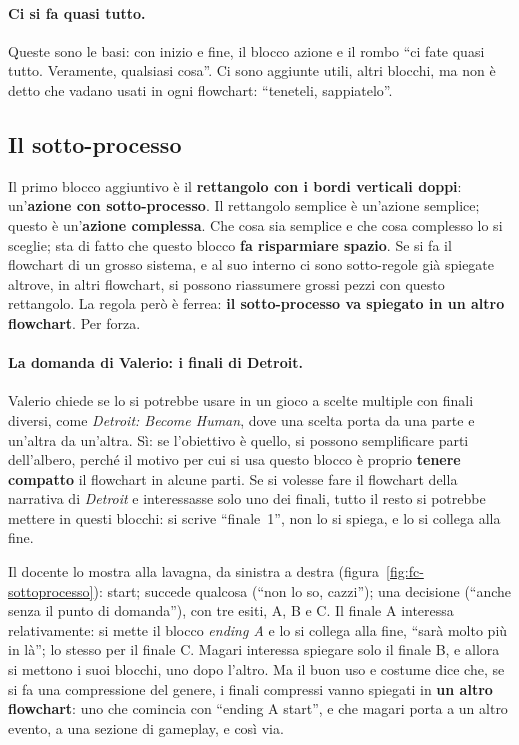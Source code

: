 \paragraph{Ci si fa quasi tutto.} Queste sono le basi: con inizio e fine, il
blocco azione e il rombo ``ci fate quasi tutto. Veramente, qualsiasi cosa''.
Ci sono aggiunte utili, altri blocchi, ma non è detto che vadano usati in ogni
flowchart: ``teneteli, sappiatelo''.

\subsection{Il sotto-processo}

Il primo blocco aggiuntivo è il \textbf{rettangolo con i bordi verticali
doppi}: un'\textbf{azione con sotto-processo}. Il rettangolo semplice è
un'azione semplice; questo è un'\textbf{azione complessa}. Che cosa sia
semplice e che cosa complesso lo si sceglie; sta di fatto che questo blocco
\textbf{fa risparmiare spazio}. Se si fa il flowchart di un grosso sistema, e
al suo interno ci sono sotto-regole già spiegate altrove, in altri
flowchart, si possono riassumere grossi pezzi con questo rettangolo. La
regola però è ferrea: \textbf{il sotto-processo va spiegato in un altro
flowchart}. Per forza.

\paragraph{La domanda di Valerio: i finali di Detroit.} Valerio chiede se lo si
potrebbe usare in un gioco a scelte multiple con finali diversi, come
\emph{Detroit: Become Human}, dove una scelta porta da una parte e un'altra da
un'altra. Sì: se l'obiettivo è quello, si possono semplificare parti
dell'albero, perché il motivo per cui si usa questo blocco è proprio
\textbf{tenere compatto} il flowchart in alcune parti. Se si volesse fare il
flowchart della narrativa di \emph{Detroit} e interessasse solo uno dei
finali, tutto il resto si potrebbe mettere in questi blocchi: si scrive
``finale~1'', non lo si spiega, e lo si collega alla fine.

Il docente lo mostra alla lavagna, da sinistra a destra
(figura~\ref{fig:fc-sottoprocesso}): start; succede qualcosa (``non lo so,
cazzi''); una decisione (``anche senza il punto di domanda''), con tre esiti,
A, B e C. Il finale A interessa relativamente: si mette il blocco
\emph{ending A} e lo si collega alla fine, ``sarà molto più in là''; lo
stesso per il finale C. Magari interessa spiegare solo il finale B, e allora
si mettono i suoi blocchi, uno dopo l'altro. Ma il buon uso e costume dice
che, se si fa una compressione del genere, i finali compressi vanno spiegati
in \textbf{un altro flowchart}: uno che comincia con ``ending A start'', e
che magari porta a un altro evento, a una sezione di gameplay, e così via.

